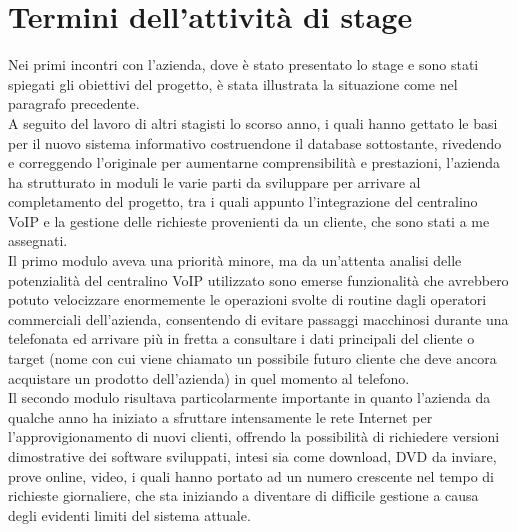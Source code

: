 \section{Termini dell'attivit\` a di stage}
Nei primi incontri con l'azienda, dove \` e stato presentato lo stage e sono stati spiegati gli obiettivi del progetto, \` e stata illustrata la situazione come nel paragrafo precedente. \\
A seguito del lavoro di altri stagisti lo scorso anno, i quali hanno gettato le basi per il nuovo sistema informativo costruendone il database sottostante, rivedendo e correggendo l'originale per aumentarne comprensibilit\` a e prestazioni, l'azienda ha strutturato in moduli le varie parti da sviluppare per arrivare al completamento del progetto, tra i quali appunto l'integrazione del centralino VoIP e la gestione delle richieste provenienti da un cliente, che sono stati a me assegnati. \\
Il primo modulo aveva una priorit\` a minore, ma da un'attenta analisi delle potenzialit\` a del centralino VoIP utilizzato sono emerse funzionalit\` a che avrebbero potuto velocizzare enormemente le operazioni svolte di routine dagli operatori commerciali dell'azienda, consentendo di evitare passaggi macchinosi durante una telefonata ed arrivare pi\` u in fretta a consultare i dati principali del cliente o target (nome con cui viene chiamato un possibile futuro cliente che deve ancora acquistare un prodotto dell'azienda) in quel momento al telefono.\\
Il secondo modulo risultava particolarmente importante in quanto l'azienda da qualche anno ha iniziato a sfruttare intensamente le rete Internet per l'approvigionamento di nuovi clienti, offrendo la possibilit\` a di richiedere versioni dimostrative dei software sviluppati, intesi sia come download, DVD da inviare, prove online, video, i quali hanno portato ad un numero crescente nel tempo di richieste giornaliere, che sta iniziando a diventare di difficile gestione a causa degli evidenti limiti del sistema attuale. 

